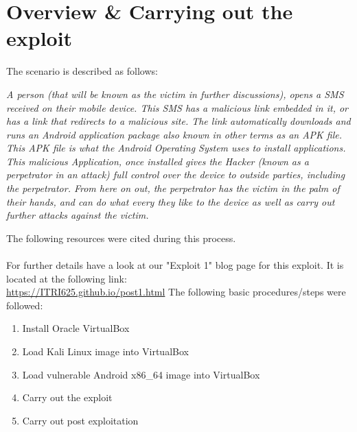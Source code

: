 \documentclass[a4paper, 12pt, titlepage]{report}
\begin{document}
\section{Overview \& Carrying out the exploit}
The scenario is described as follows:
\begin{displayquote}
\textit{A person (that will be known as the victim in further discussions), opens a SMS received on their mobile device. This SMS has a malicious link embedded in it, or has a link that redirects to a malicious site. The link automatically downloads and runs an Android application package also known in other terms as an APK file. This APK file is what the Android Operating System uses to install applications. This malicious Application, once installed gives the Hacker (known as a perpetrator in an attack) full control over the device to outside parties, including the perpetrator. From here on out, the perpetrator has the victim in the palm of their hands, and can do what every they like to the device as well as carry out further attacks against the victim.}
\end{displayquote}
The following resources were cited during this process.\cite{nmap, hypr, sdo, os1, zain, comm, meter}
\\\\
For further details have a look at our "Exploit 1" blog page for this exploit. It is located at the following link:\\
\url{https://ITRI625.github.io/post1.html}
The following basic procedures/steps were followed:
\begin{enumerate}
    \item Install Oracle VirtualBox
    \item Load Kali Linux image into VirtualBox
    \item Load vulnerable Android x86\_64 image into VirtualBox
    \item Carry out the exploit
    \item Carry out post exploitation
\end{enumerate}
\end{document}
